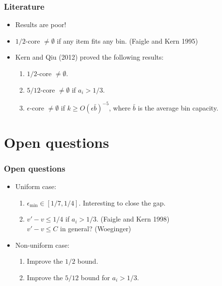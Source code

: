 \documentclass{beamer}
\begin{document}
\begin{frame}\frametitle{Literature}
  \begin{itemize}
    \item Results are poor!
    \item<2-> $1/2$-core $\neq\emptyset$ if any item fits any bin. (Faigle and Kern 1995)
    \item<3-> Kern and Qiu (2012) proved the following results:
              \begin{enumerate}
                \item $1/2$-core $\neq\emptyset$.
                \item $5/12$-core $\neq\emptyset$ if $a_i>1/3$.
                \item $\epsilon$-core $\neq\emptyset$ if $k\geq O(\epsilon\bar{b})^{-5}$, where $\bar{b}$ is the average bin capacity.
              \end{enumerate}
  \end{itemize}
\end{frame}


\section{Open questions}
\begin{frame}\frametitle{Open questions}
  \begin{itemize}
    \item Uniform case:\\
      \begin{enumerate}
        \item <2-> $\epsilon_{\min}\in[1/7,1/4]$. Interesting to close the gap.
        \item <3-> $v'-v \leq 1/4$ if $a_i>1/3$. (Faigle and Kern 1998)\\
                   $v'-v \leq C$ in general? (Woeginger)
      \end{enumerate}
    \item<4-> Non-uniform case:\\
      \begin{enumerate}
        \item <4-> Improve the $1/2$ bound.
        \item <5-> Improve the $5/12$ bound for $a_i>1/3$.
      \end{enumerate}
  \end{itemize}
\end{frame}
\end{document}
